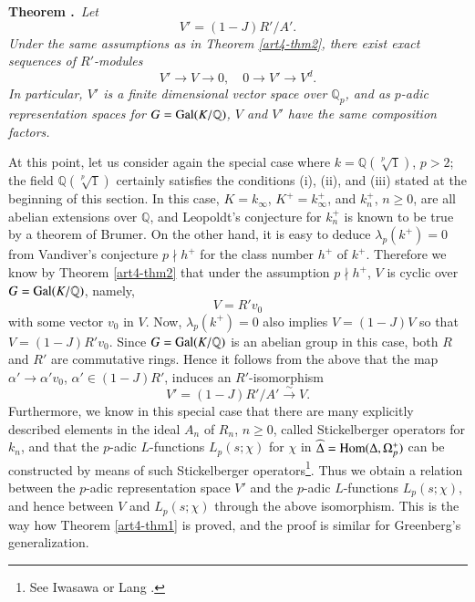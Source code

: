 \medskip
\noindent
{\bf Theorem .\label{art4-thm3}}~{\em Let}
$$
V'=(1-J)R'/A'.
$$
{\em Under the same assumptions as in Theorem \ref{art4-thm2}, there exist exact sequences of $R'$-modules}
$$
V'\to V\to 0,\quad 0\to V'\to V^{d}.
$$
{\em In particular, $V'$ is a finite dimensional vector space over $\mathbb{Q}_{p}$, and as $p$-adic representation spaces for $G=\operatorname{Gal}(K/\mathbb{Q})$, $V$ and $V'$ have the same composition factors.}

\smallskip
At this point, let us consider again the special case where $k=\mathbb{Q}(\sqrt[p]{1})$, $p>2$; the field $\mathbb{Q}(\sqrt[p]{1})$ certainly satisfies the conditions (i), (ii), and (iii) stated at the beginning of this section. In this case, $K=k_{\infty}$, $K^{+}=k^{+}_{\infty}$, and $k^{+}_{n}$, $n\geq 0$, are all abelian extensions over $\mathbb{Q}$, and Leopoldt's conjecture for $k^{+}_{n}$ is known to be true by a theorem of Brumer. On the other hand, it is easy to deduce $\lambda_{p}(k^{+})=0$ from Vandiver's conjecture $p\nmid h^{+}$ for the class number $h^{+}$ of $k^{+}$. Therefore we know by Theorem \ref{art4-thm2} that under the assumption $p\nmid h^{+}$, $V$ is cyclic over $G=\operatorname{Gal}(K/\mathbb{Q})$, namely,
$$
V=R'v_{0}
$$
with some vector $v_{0}$ in $V$. Now, $\lambda_{p}(k^{+})=0$ also implies $V=(1-J)V$ so that $V=(1-J)R'v_{0}$. Since $G=\operatorname{Gal}(K/\mathbb{Q})$ is an abelian group in this case, both $R$ and $R'$ are commutative rings. Hence it follows from the above that the map $\alpha'\to \alpha'v_{0}$, $\alpha'\in (1-J)R'$, induces an $R'$-isomorphism\pageoriginale
$$
V'=(1-J)R'/A'\xrightarrow{\sim}V.
$$
Furthermore, we know in this special case that there are many explicitly described elements in the ideal $A_{n}$ of $R_{n}$, $n\geq 0$, called Stickelberger operators for $k_{n}$, and that the $p$-adic $L$-functions $L_{p}(s;\chi)$ for $\chi$ in $\widehat{\Delta}=\operatorname{Hom}(\Delta,\Omega^{+}_{p})$ can be constructed by means of such Stickelberger operators\footnote[6]{See Iwasawa \cite{art4-key4} or Lang \cite{art4-key6}.}. Thus we obtain a relation between the $p$-adic representation space $V'$ and the $p$-adic $L$-functions $L_{p}(s;\chi)$, and hence between $V$ and $L_{p}(s;\chi)$ through the above isomorphism. This is the way how Theorem \ref{art4-thm1} is proved, and the proof is similar for Greenberg's generalization.

